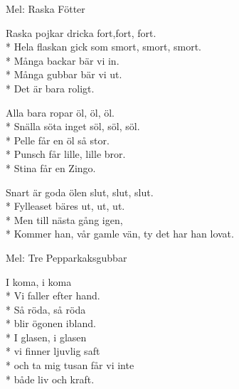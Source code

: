 \begin{SongText}[Sittningsvisa]
    \begin{SongInfo}
        Mel: Raska Fötter
    \end{SongInfo}
    \begin{SongVerse}
        Raska pojkar dricka fort,fort, fort.\\*%
        Hela flaskan gick som smort, smort, smort.\\*%
        Många backar bär vi in.\\*%
        Många gubbar bär vi ut.\\*%
        Det är bara roligt.
    \end{SongVerse}
    \begin{SongVerse}
        Alla bara ropar öl, öl, öl.\\*%
        Snälla söta inget söl, söl, söl.\\*%
        Pelle får en öl så stor.\\*%
        Punsch får lille, lille bror.\\*%
        Stina får en Zingo.
    \end{SongVerse}
    \begin{SongVerse}
        Snart är goda ölen slut, slut, slut.\\*%
        Fylleaset bäres ut, ut, ut.\\*%
        Men till nästa gång igen,\\*%
        Kommer han, vår gamle vän, ty det har han lovat.
    \end{SongVerse}
\end{SongText}
\begin{SongText}[I koma]
    \begin{SongInfo}
        Mel: Tre Pepparkaksgubbar
    \end{SongInfo}
    \begin{SongVerse}
        I koma, i koma\\*%
        Vi faller efter hand.\\*%
        Så röda, så röda\\*%
        blir ögonen ibland.\\*%
        I glasen, i glasen\\*%
        vi finner ljuvlig saft\\*%
        och ta mig tusan får vi inte\\*%
        både liv och kraft.
    \end{SongVerse}
\end{SongText}
